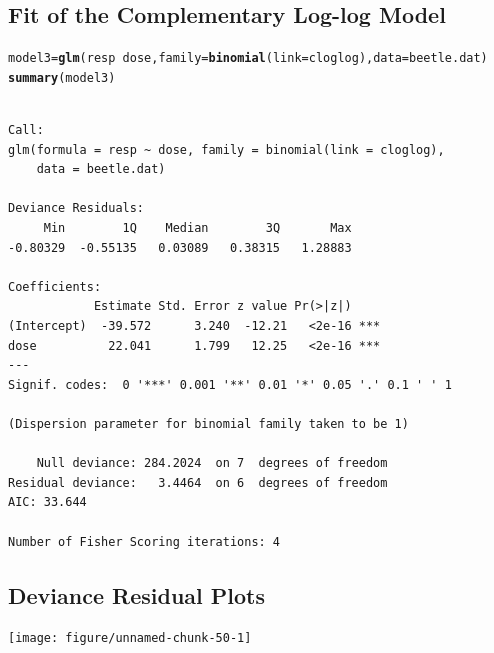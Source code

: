 \documentclass{article}\usepackage[]{graphicx}\usepackage[svgnames]{xcolor}
\makeatletter
\newcommand{\hlopt}[1]{\textcolor[rgb]{0,0,0}{#1}}%
\newcommand{\hlstd}[1]{\textcolor[rgb]{0.345,0.345,0.345}{#1}}%
\newcommand{\hlkwb}[1]{\textcolor[rgb]{0.69,0.353,0.396}{#1}}%
\newcommand{\hlkwc}[1]{\textcolor[rgb]{0.333,0.667,0.333}{#1}}%
\newcommand{\hlkwd}[1]{\textcolor[rgb]{0.737,0.353,0.396}{\textbf{#1}}}%
\newenvironment{kframe}{%
 \def\at@end@of@kframe{}%
 \ifinner\ifhmode%
  \def\at@end@of@kframe{\end{minipage}}%
  \begin{minipage}{\columnwidth}%
 \fi\fi%
 \def\FrameCommand##1{\hskip\@totalleftmargin \hskip-\fboxsep
 \colorbox{shadecolor}{##1}\hskip-\fboxsep
     \hskip-\linewidth \hskip-\@totalleftmargin \hskip\columnwidth}%
 \MakeFramed {\advance\hsize-\width
   \@totalleftmargin\z@ \linewidth\hsize
   \@setminipage}}%
 {\par\unskip\endMakeFramed%
 \at@end@of@kframe}
\newenvironment{knitrout}{}{} %
\makeatother
\begin{document}
\subsection*{Fit of the Complementary Log-log Model}
\begin{knitrout}
\color{fgcolor}\begin{kframe}
\begin{alltt}
\hlstd{model3} \hlkwb{=} \hlkwd{glm}\hlstd{(resp} \hlopt{~} \hlstd{dose,} \hlkwc{family} \hlstd{=} \hlkwd{binomial}\hlstd{(}\hlkwc{link} \hlstd{= cloglog),} \hlkwc{data} \hlstd{= beetle.dat)}
\hlkwd{summary}\hlstd{(model3)}
\end{alltt}
\begin{verbatim}

Call:
glm(formula = resp ~ dose, family = binomial(link = cloglog), 
    data = beetle.dat)

Deviance Residuals: 
     Min        1Q    Median        3Q       Max  
-0.80329  -0.55135   0.03089   0.38315   1.28883  

Coefficients:
            Estimate Std. Error z value Pr(>|z|)    
(Intercept)  -39.572      3.240  -12.21   <2e-16 ***
dose          22.041      1.799   12.25   <2e-16 ***
---
Signif. codes:  0 '***' 0.001 '**' 0.01 '*' 0.05 '.' 0.1 ' ' 1

(Dispersion parameter for binomial family taken to be 1)

    Null deviance: 284.2024  on 7  degrees of freedom
Residual deviance:   3.4464  on 6  degrees of freedom
AIC: 33.644

Number of Fisher Scoring iterations: 4
\end{verbatim}
\end{kframe}
\end{knitrout}
\subsection*{Deviance Residual Plots}
\begin{knitrout}
\color{fgcolor}

{\centering \texttt{[image: figure/unnamed-chunk-50-1]} 

}


\end{knitrout}
\end{document}
